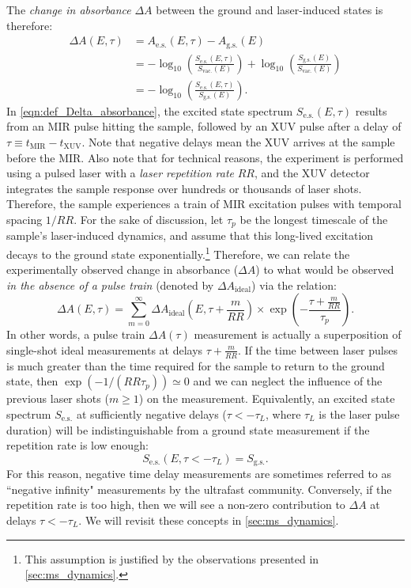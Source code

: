 The \textit{change in absorbance} $\Delta A$ between the ground and laser-induced states is therefore:
\begin{equation}
\begin{aligned}
\Delta A(E,\tau) &= A_{\textrm{e.s.}}(E,\tau) - A_{\textrm{g.s.}}(E)\\
&= - \log_{10} \left( \frac{S_{\textrm{e.s.}}(E,\tau)}{S_{\textrm{vac.}}(E)} \right) + \log_{10} \left( \frac{S_{\textrm{g.s.}}(E)}{S_{\textrm{vac.}}(E)} \right)\\
&= - \log_{10} \left( \frac{S_{\textrm{e.s.}}(E,\tau)}{S_{\textrm{g.s.}}(E)} \right).
\end{aligned}
\label{eqn:def_Delta_absorbance}
\end{equation}
In \cref{eqn:def_Delta_absorbance}, the excited state spectrum $S_{\textrm{e.s.}}(E, \tau)$ results from an MIR pulse hitting the sample, followed by an XUV pulse after a delay of $\tau \equiv t_{\textrm{MIR}} - t_{\textrm{XUV}}$. Note that negative delays mean the XUV arrives at the sample before the MIR. Also note that for technical reasons, the experiment is performed using a pulsed laser with a \textit{laser repetition rate} $RR$, and the XUV detector integrates the sample response over hundreds or thousands of laser shots. Therefore, the sample experiences a train of MIR excitation pulses with temporal spacing $1/RR$. For the sake of discussion, let $\tau_p$ be the longest timescale of the sample's laser-induced dynamics, and assume that this long-lived excitation decays to the ground state exponentially.\footnote{This assumption is justified by the observations presented in \cref{sec:ms_dynamics}.} Therefore, we can relate the experimentally observed change in absorbance ($\Delta A$) to what would be observed \textit{in the absence of a pulse train} (denoted by $\Delta A_{\textrm{ideal}}$) via the relation:
\begin{equation}
\Delta A(E, \tau) = \sum_{m=0}^{\infty} \Delta A_{\textrm{ideal}} \left( E, \tau + \frac{m}{RR} \right) \times \exp(-\frac{\tau + \frac{m}{RR}}{\tau_p}).
\end{equation}
In other words, a pulse train $\Delta A(\tau)$ measurement is actually a superposition of single-shot ideal measurements at delays $\tau + \frac{m}{RR}$. If the time between laser pulses is much greater than the time required for the sample to return to the ground state, then $\exp(-1/(RR \tau_p)) \simeq 0$ and we can neglect the influence of the previous laser shots ($m\ge 1$) on the measurement. Equivalently, an excited state spectrum $S_{\textrm{e.s.}}$ at sufficiently negative delays ($\tau < - \tau_L$, where $\tau_L$ is the laser pulse duration) will be indistinguishable from a ground state measurement if the repetition rate is low enough:
\begin{equation}
S_{\textrm{e.s.}}(E, \tau < -\tau_L) = S_{\textrm{g.s.}}.
\end{equation}
For this reason, negative time delay measurements are sometimes referred to as ``negative infinity" measurements by the ultrafast community. Conversely, if the repetition rate is too high, then we will see a non-zero contribution to $\Delta A$ at delays $\tau < -\tau_L$. We will revisit these concepts in \cref{sec:ms_dynamics}.

